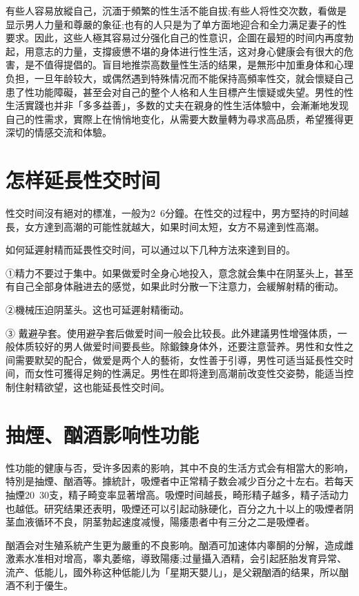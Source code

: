 \documentclass[12pt,UTF8]{ctexbook}
\begin{document}
有些人容易放縱自己，沉湎于頻繁的性生活不能自拔;有些人将性交次数，看做是显示男人力量和尊嚴的象征;也有的人只是为了单方面地迎合和全力满足妻子的性要求。因此，这些人極其容易过分强化自己的性意识，企圖在最短的时间内再度勃起，用意志的力量，支撐疲憊不堪的身体进行性生活，这对身心健康会有很大的危害，是不值得提倡的。盲目地推崇高数量性生活的结果，是無形中加重身体和心理负担，一旦年龄较大，或偶然遇到特殊情况而不能保持高頻率性交，就会懷疑自己患了性功能障礙，甚至会对自己的整个人格和人生目標产生懷疑或失望。男性的性生活實踐也并非「多多益善」，多数的丈夫在親身的性生活体驗中，会漸漸地发现自己的性需求，實際上在悄悄地变化，从需要大数量轉为尋求高品质，希望獲得更深切的情感交流和体驗。

\section{怎样延長性交时间}

性交时间沒有絕对的標准，一般为2~6分鐘。在性交的过程中，男方堅持的时间越長，女方達到高潮的可能性就越大，如果时间太短，女方不易達到性高潮。

如何延遲射精而延畏性交时间，可以通过以下几种方法來達到目的。

①精力不要过于集中。如果做爱时全身心地投入，意念就会集中在阴茎头上，甚至有自己全部身体融进去的感觉，如果此时分散一下注意力，会緩解射精的衝动。

②機械压迫阴茎头。这也可延遲射精衝动。

③ 戴避孕套。使用避孕套后做爱时间一般会比较長。此外建議男性增强体质，一般体质较好的男人做爱时间要長些。除鍛鍊身体外，还要注意营养。男性和女性之间需要默契的配合，做爱是两个人的藝術，女性善于引導，男性可适当延長性交时间，而女性可獲得足夠的性满足。男性在即将達到高潮前改变性交姿勢，能适当控制住射精欲望，这也能延長性交时间。

\section{抽煙、酗酒影响性功能}

性功能的健康与否，受许多因素的影响，其中不良的生活方式会有相當大的影响，特別是抽煙、酗酒等。據統計，吸煙者中正常精子数会减少百分之十左右。若每天抽煙20~30支，精子畸变率显著增高。吸煙时间越長，畸形精子越多，精子活动力也越低。研究结果还表明，吸煙还可以引起动脉硬化，百分之九十以上的吸煙者阴茎血液循环不良，阴茎勃起速度减慢，陽痿患者中有三分之二是吸煙者。

酗酒会对生殖系統产生更为嚴重的不良影响。酗酒可加速体内睾酮的分解，造成雌激素水准相对增高，睾丸萎缩，導致陽痿;过量攝入酒精，会引起胚胎发育异常、流产、低能儿，國外称这种低能儿为「星期天嬰儿」，是父親酗酒的结果，所以酗酒不利于優生。
\end{document}
